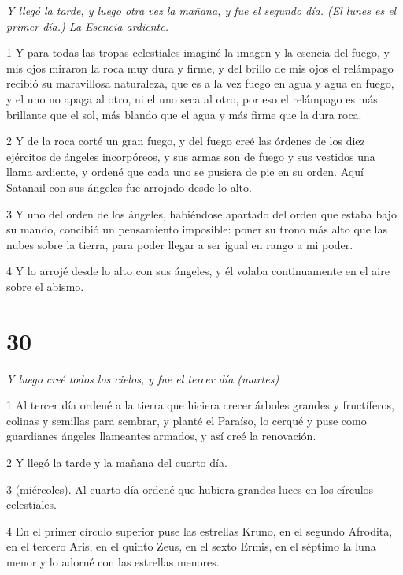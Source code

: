 \par \textit{Y llegó la tarde, y luego otra vez la mañana, y fue el segundo día. (El lunes es el primer día.) La Esencia ardiente.}

\par 1 Y para todas las tropas celestiales imaginé la imagen y la esencia del fuego, y mis ojos miraron la roca muy dura y firme, y del brillo de mis ojos el relámpago recibió su maravillosa naturaleza, que es a la vez fuego en agua y agua en fuego, y el uno no apaga al otro, ni el uno seca al otro, por eso el relámpago es más brillante que el sol, más blando que el agua y más firme que la dura roca.

\par 2 Y de la roca corté un gran fuego, y del fuego creé las órdenes de los diez ejércitos de ángeles incorpóreos, y sus armas son de fuego y sus vestidos una llama ardiente, y ordené que cada uno se pusiera de pie en su orden. Aquí Satanail con sus ángeles fue arrojado desde lo alto.

\par 3 Y uno del orden de los ángeles, habiéndose apartado del orden que estaba bajo su mando, concibió un pensamiento imposible: poner su trono más alto que las nubes sobre la tierra, para poder llegar a ser igual en rango a mi poder.

\par 4 Y lo arrojé desde lo alto con sus ángeles, y él volaba continuamente en el aire sobre el abismo.

\chapter{30}

\par \textit{Y luego creé todos los cielos, y fue el tercer día (martes)}

\par 1 Al tercer día ordené a la tierra que hiciera crecer árboles grandes y fructíferos, colinas y semillas para sembrar, y planté el Paraíso, lo cerqué y puse como guardianes ángeles llameantes armados, y así creé la renovación.

\par 2 Y llegó la tarde y la mañana del cuarto día.

\par 3 (miércoles). Al cuarto día ordené que hubiera grandes luces en los círculos celestiales.

\par 4 En el primer círculo superior puse las estrellas Kruno, en el segundo Afrodita, en el tercero Aris, en el quinto Zeus, en el sexto Ermis, en el séptimo la luna menor y lo adorné con las estrellas menores.

